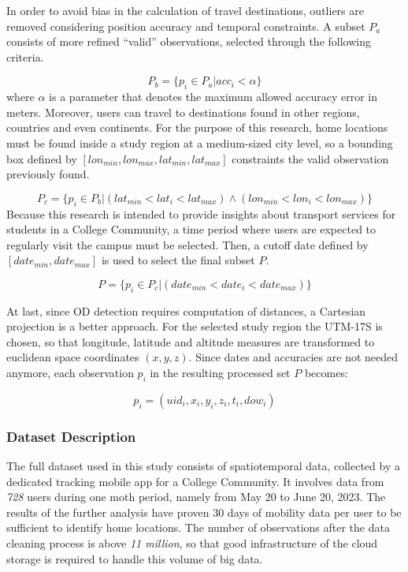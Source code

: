 \documentclass[]{elsarticle} %
\begin{document}
In order to avoid bias in the calculation of travel destinations,
outliers are removed considering position accuracy and temporal
constraints. A subset \(P_a\) consists of more refined ``valid''
observations, selected through the following criteria.

\[ P_b  =  \{p_i\in P_a | acc_i< \alpha \}\] where \(\alpha\) is a
parameter that denotes the maximum allowed accuracy error in meters.
Moreover, users can travel to destinations found in other regions,
countries and even continents. For the purpose of this research, home
locations must be found inside a study region at a medium-sized city
level, so a bounding box defined by
\([lon_{min}, lon_{max}, lat_{min}, lat_{max}]\) constraints the valid
observation previously found.

\[ P_c  =  \{p_i\in P_b | (lat_{min}<lat_i<lat_{max}) \wedge   (lon_{min}<lon_i<lon_{max}) \}\]
Because this research is intended to provide insights about transport
services for students in a College Community, a time period where users
are expected to regularly visit the campus must be selected. Then, a
cutoff date defined by \([date_{min}, date_{max}]\) is used to select
the final subset \(P\).

\[ P  =  \{p_i\in P_c | (date_{min}<date_i<date_{max}) \}\]

At last, since OD detection requires computation of distances, a
Cartesian projection is a better approach. For the selected study region
the UTM-17S is chosen, so that longitude, latitude and altitude measures
are transformed to euclidean space coordinates \((x,y,z)\). Since dates
and accuracies are not needed anymore, each observation \(p_i\) in the
resulting processed set \(P\) becomes:

\[ p_i  = (uid_i, x_i, y_i, z_i, t_i, dow_i) \]

\hypertarget{dataset-description}{%
\subsubsection{Dataset Description}\label{dataset-description}}

The full dataset used in this study consists of spatiotemporal data,
collected by a dedicated tracking mobile app for a College Community. It
involves data from \emph{728} users during one moth period, namely from
May 20 to June 20, 2023. The results of the further analysis have proven
30 days of mobility data per user to be sufficient to identify home
locations. The number of observations after the data cleaning process is
above \emph{11 million}, so that good infrastructure of the cloud
storage is required to handle this volume of big data.
\end{document}
